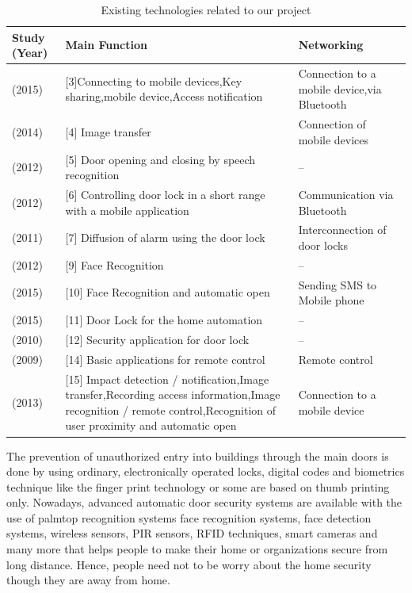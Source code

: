 \documentclass[twoside,a4paper,16pt]{book}
\begin{document}
{{			\begin{center}
				\begin{table}[h!]
					\centering
					\begin{tabular}{|p{2cm}|p{6cm}|p{5cm}|}
						\hline
						Study (Year) & Main Function & Networking\\
						\hline	
						(2015) & [3]Connecting to mobile devices,Key sharing,mobile device,Access notification & Connection to a mobile device,via Bluetooth\\
						\hline
						(2014) & [4] Image transfer & Connection of mobile devices\\
						\hline
						(2012) & [5] Door opening and closing by speech recognition & –	\\
						\hline
						(2012) & [6] Controlling door lock in a short range with a mobile application & Communication via Bluetooth\\
						\hline
						(2011) & [7] Diffusion of alarm using the door lock & Interconnection of door locks\\
						\hline
						(2012) & [9] Face Recognition & –\\
						\hline
						(2015) & [10] Face Recognition and automatic open & Sending SMS to Mobile phone\\
						\hline
						(2015) & [11] Door Lock for the home automation & –\\
						\hline
						(2010) & [12] Security application for door lock & –\\
						\hline
						(2009) & [14] Basic applications for remote control & Remote control\\
						\hline
						(2013) & [15] Impact detection / notification,Image transfer,Recording access information,Image recognition / remote control,Recognition of user proximity and automatic open & Connection to a	mobile device\\
						\hline	
					\end{tabular}
					\caption{Existing  technologies related to our project}	
				\end{table}
			\end{center}
			The prevention of unauthorized entry into buildings
			through the main doors is done by using ordinary,
			electronically operated locks, digital codes and biometrics
			technique like the finger print technology or some are
			based on thumb printing only. Nowadays, advanced
			automatic door security systems are available with the use
			of palmtop recognition systems face recognition systems,
			face detection systems, wireless sensors, PIR sensors,
			RFID techniques, smart cameras and many more that helps
			people to make their home or organizations secure from
			long distance. Hence, people need not to be worry about
			the home security though they are away from home.
}}
\end{document}
